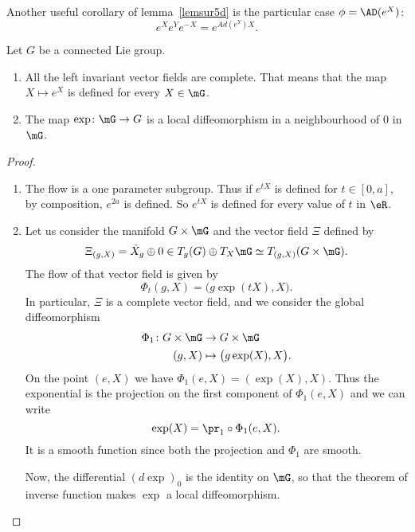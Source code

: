 \begin{corollary}
Another useful corollary of lemma~\ref{lemsur5d} is the particular case $\phi=\AD(e^X)$:
\[
   e^Xe^Ye^{-X}=e^{Ad(e^Y)X}.
\]
\label{cor:eXeYe-X}
\end{corollary}

\begin{proposition}
	Let $G$ be a connected Lie group.
	\begin{enumerate}

		\item
			All the left invariant vector fields are complete. That means that the map $X\mapsto  e^{X}$ is defined for every $X\in \mG$.
		\item
			The map $\exp\colon \mG\to G$ is a local diffeomorphism in a neighbourhood of $0$ in $\mG$.
	\end{enumerate}
\end{proposition}

\begin{proof}
	\begin{enumerate}

		\item
			The flow is a one parameter subgroup. Thus if $ e^{tX}$ is defined for $t\in[0,a]$, by composition, $ e^{2a}$ is defined. So $ e^{tX}$ is defined for every value of $t$ in $\eR$.
		\item
			Let us consider the manifold $G\times \mG$ and the vector field $\Xi$ defined by
			\begin{equation}
				\Xi_{(g,X)}=\tilde X_g\oplus 0\in T_g(G)\oplus T_X\mG\simeq T_{(g,X)}(G\times \mG).
			\end{equation}
			The flow of that vector field is given by
			\begin{equation}
				\Phi_t(g,X)=\big( g\exp(tX),X \big).
			\end{equation}
			In particular, $\Xi$ is a complete vector field, and we consider the global diffeomorphism
			\begin{equation}
				\begin{aligned}
					\Phi_1\colon G\times \mG&\to G\times \mG \\
					(g,X)&\mapsto \big( g\exp(X),X \big).
				\end{aligned}
			\end{equation}
			On the point $(e,X)$ we have $\Phi_1(e,X)=(\exp(X),X)$. Thus the exponential is the projection on the first component of $\Phi_1(e,X)$ and we can write
			\begin{equation}
				\exp(X)=\pr_1\circ\Phi_1(e,X).
			\end{equation}
			It is a smooth function since both the projection and $\Phi_1$ are smooth.

			Now, the differential $(d\exp)_0$ is the identity on $\mG$, so that the theorem of inverse function makes $\exp$ a local diffeomorphism.
	\end{enumerate}
\end{proof}


